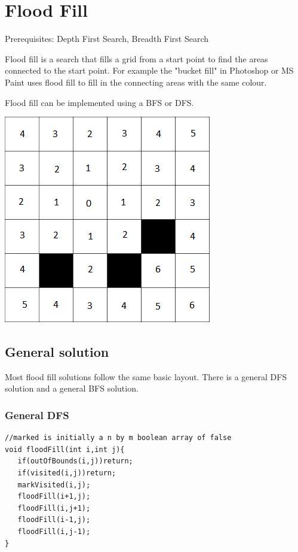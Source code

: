 \documentclass[11pt,oneside]{book}
\makeatletter
\def\maxwidth#1{\ifdim\Gin@nat@width>#1 #1\else\Gin@nat@width\fi}
\makeatother
\begin{document}
\section{Flood Fill}

Prerequisites: Depth First Search, Breadth First Search

Flood fill is a search that fills a grid from a start point to find the areas connected to the start point. For example the "bucket fill" in Photoshop or MS Paint uses flood fill to fill in the connecting areas with the same colour.

Flood fill can be implemented using a BFS or DFS.

\includegraphics[width=\maxwidth{\textwidth}]{floodfill.png}

\subsection{General solution}

Most flood fill solutions follow the same basic layout. There is a general DFS solution and a general BFS solution.

\subsubsection{General DFS}

\begin{lstlisting}
//marked is initially a n by m boolean array of false
void floodFill(int i,int j){
   if(outOfBounds(i,j))return;
   if(visited(i,j))return;
   markVisited(i,j);
   floodFill(i+1,j);
   floodFill(i,j+1);
   floodFill(i-1,j);
   floodFill(i,j-1);
}
\end{lstlisting}
\end{document}
